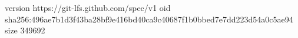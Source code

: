 version https://git-lfs.github.com/spec/v1
oid sha256:496ae7b1d3f43ba28bf9e416bd40ca9c40687f1b0bbed7e7dd223d54a0c5ae94
size 349692
